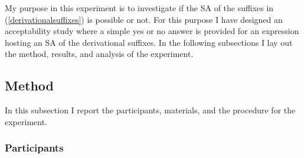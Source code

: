 My purpose in this experiment is to investigate if the SA of the suffixes in (\ref{derivationalsuffixes}) is possible or not. For this purpose I have designed an acceptability study where a simple yes or no answer is provided for an expression hosting an SA of the derivational suffixes. In the following subsections I lay out the method, results, and analysis of the experiment.

\subsection{Method}
In this subsection I report the participants, materials, and the procedure for the experiment.
\subsubsection{Participants}

